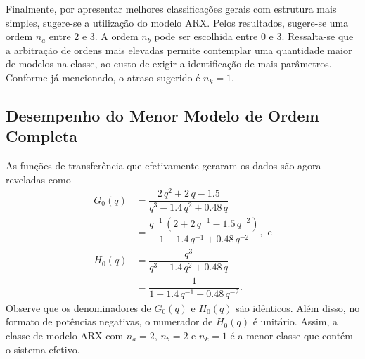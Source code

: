 \documentclass{ppgeesa}
\newcommand{\Prod}{\,}
\begin{document}
Finalmente, por apresentar melhores classificações gerais com estrutura mais simples, sugere-se a utilização do modelo ARX.
Pelos resultados, sugere-se uma ordem $n_a$ entre 2 e 3.
A ordem $n_b$ pode ser escolhida entre 0 e 3.
Ressalta-se que a arbitração de ordens mais elevadas permite contemplar uma quantidade maior de modelos na classe, ao custo de exigir a identificação de mais parâmetros.
Conforme já mencionado, o atraso sugerido é $n_k = 1$.

\subsection{Desempenho do Menor Modelo de Ordem Completa}
As funções de transferência que efetivamente geraram os dados são agora reveladas como
\begin{align}
  G_0(q) &= \dfrac{                   \num{2} \Prod q^2 + \num{2} \Prod q      - \num{1.5}                    }{q^3 - \num{1.4} \Prod q^2    + \num{0.48} \Prod q     }
  \\
         &= \dfrac{q^{-1} \Prod \left(\num{2}           + \num{2} \Prod q^{-1} - \num{1.5} \Prod q^{-2}\right)}{1   - \num{1.4} \Prod q^{-1} + \num{0.48} \Prod q^{-2}}
  , \text{ e}
  \\
  H_0(q) &= \dfrac{q^3}{q^3 - \num{1.4} \Prod q^2    + \num{0.48} \Prod q     }
  \\
         &= \dfrac{1  }{1   - \num{1.4} \Prod q^{-1} + \num{0.48} \Prod q^{-2}}
  .
\end{align}
Observe que os denominadores de $G_0(q)$ e $H_0(q)$ são idênticos.
Além disso, no formato de potências negativas, o numerador de $H_0(q)$ é unitário.
Assim, a classe de modelo ARX com $n_a = 2$, $n_b = 2$ e $n_k = 1$ é a menor classe que contém o sistema efetivo.
\end{document}
